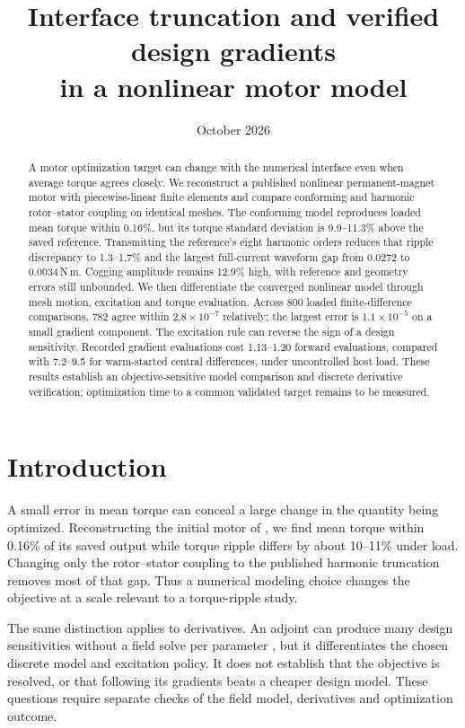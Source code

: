 \documentclass{anvil-paper}
\title{Interface truncation and verified design gradients\\
in a nonlinear motor model}
\author{}
\date{October 2026}
\begin{document}
\maketitle
\begin{abstract}
A motor optimization target can change with the numerical interface even
when average torque agrees closely. We reconstruct a published nonlinear
permanent-magnet motor with piecewise-linear finite elements and compare
conforming and harmonic rotor--stator coupling on identical meshes.
The conforming model reproduces loaded mean torque within 0.16\%, but its
torque standard deviation is 9.9--11.3\% above the saved reference.
Transmitting the reference's eight harmonic orders reduces that ripple
discrepancy to 1.3--1.7\% and the largest full-current waveform gap from
0.0272 to 0.0034\,N\,m. Cogging amplitude remains 12.9\% high, with reference
and geometry errors still unbounded. We then differentiate the converged
nonlinear model through mesh motion, excitation and torque evaluation.
Across 800 loaded finite-difference comparisons, 782 agree within
$2.8\times10^{-7}$ relatively; the largest error is $1.1\times10^{-5}$
on a small gradient component. The excitation rule can reverse the sign
of a design sensitivity. Recorded gradient evaluations cost 1.13--1.20
forward evaluations, compared with 7.2--9.5 for warm-started central
differences, under uncontrolled host load. These results establish an
objective-sensitive model comparison and discrete derivative verification;
optimization time to a common validated target remains to be measured.
\end{abstract}

\section{Introduction}
A small error in mean torque can conceal a large change in the quantity
being optimized. Reconstructing the initial motor of
\citet{wiesheu2024spline}, we find mean torque within 0.16\% of its saved
output while torque ripple differs by about 10--11\% under load.
Changing only the rotor--stator coupling to the published harmonic
truncation removes most of that gap. Thus a numerical modeling choice
changes the objective at a scale relevant to a torque-ripple study.

The same distinction applies to derivatives. An adjoint can produce many
design sensitivities without a field solve per parameter
\citep{scotzniovsky2024}, but it differentiates the chosen discrete model
and excitation policy. It does not establish that the objective is
resolved, or that following its gradients beats a cheaper design model.
These questions require separate checks of the field model, derivatives
and optimization outcome.
\end{document}
